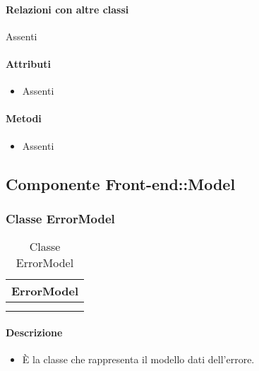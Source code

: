 \paragraph*{Relazioni con altre classi}
Assenti

\paragraph*{Attributi}
\begin{itemize}
\item[] Assenti
\end{itemize}

\paragraph*{Metodi}
\begin{itemize}
\item[] Assenti
\end{itemize}

\subsection{Componente Front-end::Model}

\subsubsection{Classe ErrorModel}

\begin{table}[ht]
\begin{center}
\bgroup
\setlength{\arrayrulewidth}{0.6mm}
\def\arraystretch{1}
\begin{tabular}{ | p{12cm} | }
\hline
\centerline{\textbf{ErrorModel}}
\\ \hline
 \\ 
\hline
 \\ 
\hline
\end{tabular}
\egroup
\caption{Classe ErrorModel}
\end{center}
\end{table}

\paragraph*{Descrizione}
\begin{itemize}
\item[] È la classe che rappresenta il modello dati dell'errore.
\end{itemize}

